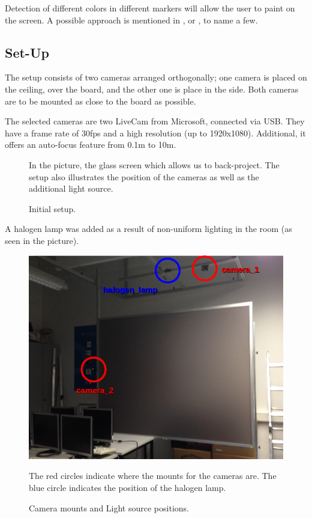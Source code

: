 \documentclass[a4paper,12pt]{article}
\begin{document}
Detection of different colors in different markers will allow the user to paint on the screen. A possible approach is mentioned in \cite{fieguth}, \cite{mason} or \cite{McKenna}, to name a few.

\subsection*{Set-Up}
The setup consists of two cameras arranged orthogonally; one camera is placed on the ceiling, over the board, and the other one is place in the side. Both cameras are to be mounted as close to the board as possible.

The selected cameras are two LiveCam from Microsoft, connected via USB. They have a frame rate of 30fps and a high resolution (up to 1920x1080). Additional, it offers an auto-focus feature from 0.1m to 10m.

\begin{figure}[H]
    \begin{center}
	\caption{Initial setup.}
    In the picture, the glass screen which allows us to back-project. The setup also illustrates the position of the cameras as well as the additional light source.
	\label{fig:setup}
    \end{center}
\end{figure}

A halogen lamp was added as a result of non-uniform lighting in the room (as seen in the picture).

\begin{figure}[H]
    \begin{center}
	\includegraphics[width=12cm]{setupCams}
	\caption{Camera mounts and Light source positions.}
    The red circles indicate where the mounts for the cameras are. The blue circle indicates the position of the halogen lamp.
	\label{fig:setupcams}
    \end{center}
\end{figure}
\end{document}
